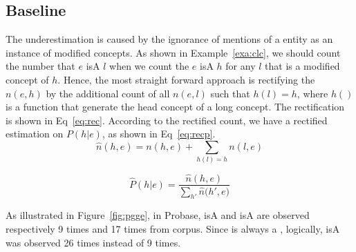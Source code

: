 
\subsection{Baseline}
The underestimation is caused by the ignorance of mentions of a entity as an instance of modified concepts. As shown in Example~\ref{exa:clc}, we should count the number that $e$ isA ${l}$ when we count the $e$ isA ${h}$ for any $l$ that is a modified concept of $h$.
Hence, the most straight forward approach is rectifying the $n(e, h)$ by the additional count
of all $n(e, l)$ such that $h(l)=h$, where $h()$ is a function that generate the head concept of a long concept. The rectification is shown in Eq~\ref{eq:rec}. According to the rectified count, we have a rectified estimation on $P(h|e)$, as shown in Eq~\ref{eq:recp}.
\begin{equation}
\hat{n}(h, e)={n}(h, e)+\sum_{ h(l)=h} n(l,e)
\label{eq:rec}
\end{equation}

\begin{equation}
\hat{P}(h|e)=\frac{\hat{n}(h, e)}{\sum_{{h'}}{\hat{n}({h'}}, e)}
\label{eq:recp}
\end{equation}

\begin{example}
\label{exa:clc}
As illustrated in Figure~\ref{fig:pgge}, in Probase,  isA   and  isA  are observed respectively 9 times and 17 times from corpus. Since  is always a ,  logically,  isA  was observed 26 times instead of 9 times.
\end{example}


